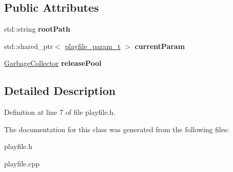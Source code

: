 \subsection*{Public Attributes}
\begin{DoxyCompactItemize}
\item 
\mbox{\label{classfile__play_aaddaacea18653399886df0fd5c8a4a8b}} 
std\+::string {\bfseries root\+Path}
\item 
\mbox{\label{classfile__play_a31085df5c45da6b08e325b19180d21e9}} 
std\+::shared\+\_\+ptr$<$ \hyperlink{structfile__play_1_1playfile__param__t}{playfile\+\_\+param\+\_\+t} $>$ {\bfseries current\+Param}
\item 
\mbox{\label{classfile__play_a08556103bb7257021f1426faddc6f7fb}} 
\hyperlink{classGarbageCollector}{Garbage\+Collector} {\bfseries release\+Pool}
\end{DoxyCompactItemize}


\subsection{Detailed Description}


Definition at line 7 of file playfile.\+h.



The documentation for this class was generated from the following files\+:\begin{DoxyCompactItemize}
\item 
playfile.\+h\item 
playfile.\+cpp\end{DoxyCompactItemize}
